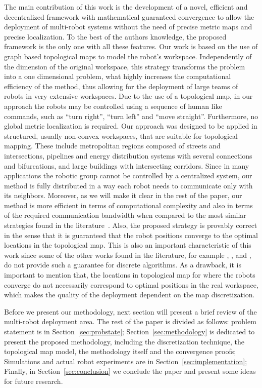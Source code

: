 \documentclass[smallcondensed]{svjour3}
\begin{document}
{\color{blue} The main contribution of this work is the development of a novel, efficient and decentralized framework with mathematical guaranteed convergence to allow the deployment of multi-robot systems without the need of precise metric maps and precise localization. To the best of the authors knowledge, the proposed framework is the only one with all these features. Our work is based on the use of graph based topological maps to model the robot's workspace. Independently of the dimension of the original workspace, this strategy transforms the problem into a one dimensional problem, what highly increases the computational efficiency of the method, thus allowing for the deployment of large teams of robots in very extensive workspaces. Due to the use of a topological map, in our approach the robots may be controlled using a sequence of human like commands, such as ``turn right'', ``turn left'' and ``move straight''. Furthermore, no global metric localization is required. Our approach  was designed to be applied in structured, usually non-convex workspaces, that are suitable for topological mapping. These include metropolitan regions composed of streets and intersections, pi\-pe\-lines and energy distribution systems with several connections and bifurcations, and large buildings with intersecting corridors. Since in many applications the robotic group cannot be controlled by a centralized system, our method is fully distributed 
in a way each robot needs to communicate only with its neighbors. Moreover, as we will make it clear in the rest of the paper, our method is more efficient in terms of computational complexity and also in terms of the required communication bandwidth when compared to the most similar  strategies found in the literature~\cite{Durham2012,Yun2013}. Also, the proposed strategy is provably correct in the sense that it is guaranteed that the robot positions converge to the optimal locations in the topological map. This is also an important characteristic of this work since some of the other works found in the literature, for example \cite{Bhattacharya2013a}, \cite{Bhattacharya2013IJRR}, and \cite{reza2014}, do not provide such a guarantee for  discrete algorithms. As a drawback, it is important to mention that, the locations in topological map for where the robots converge do not necessarily correspond to optimal positions in the real workspace, which makes the quality of the deployment dependent on the map discretization.}

Before we present our methodology, next section will present a brief review of the multi-robot deployment area. The rest of the paper is divided as follows: problem statement is in Section~\ref{sec:probstate}; Section~\ref{sec:methodology} is dedicated to present the proposed methodology, including the discretization technique, the topological map model, the methodology itself and the convergence proofs; Simulations and actual robot experiments are in Section~\ref{sec:implementation}; Finally, in Section~\ref{sec:conclusion} we conclude the paper and present some ideas for future research.
\end{document}
